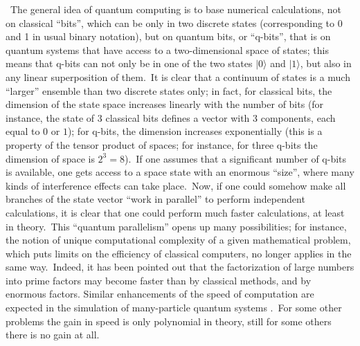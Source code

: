 \documentclass[12pt,onecolumn]{article}%
\begin{document}
\ The general idea of quantum computing \cite{Deutsch} is to base numerical
calculations, not on classical ``bits'', which can be only in two discrete
states (corresponding to 0 and 1 in usual binary notation), but on quantum
bits, or ``q-bits'', that is on quantum systems that have access to a
two-dimensional space of states; this means that q-bits can not only be in one
of the two states $|0\rangle$ and $|1\rangle$, but also in any linear superposition
of them.\ It is clear that a continuum of states is a much ``larger'' ensemble
than two discrete states only; in fact, for classical bits, the dimension of
the state space increases linearly with the number of bits (for instance, the
state of 3 classical bits defines a vector with 3 components, each equal to
$0$ or $1$); for q-bits, the dimension increases exponentially (this is a
property of the tensor product of spaces; for instance, for three q-bits the
dimension of space is $2^{3}=8$).\ If one assumes that a significant number of
q-bits is available, one gets access to a space state with an enormous
``size'', where many kinds of interference effects can take place.\ Now, if
one could somehow make all branches of the state vector ``work in parallel''
to perform independent calculations, it is clear that one could perform much
faster calculations, at least in theory.\ This ``quantum parallelism'' opens
up many possibilities; for instance, the notion of unique computational
complexity of a given mathematical problem, which puts limits on the
efficiency of classical computers, no longer applies in the same way.\ Indeed,
it has been pointed out \cite{Shor} that the factorization of large numbers
into prime factors may become faster than by classical methods, and by
enormous factors. Similar enhancements of the speed of computation are
expected in the simulation of many-particle quantum systems \cite{Abrams}%
.\ For some other problems the gain in speed is only polynomial in theory,
still for some others there is no gain at all.
\end{document}

